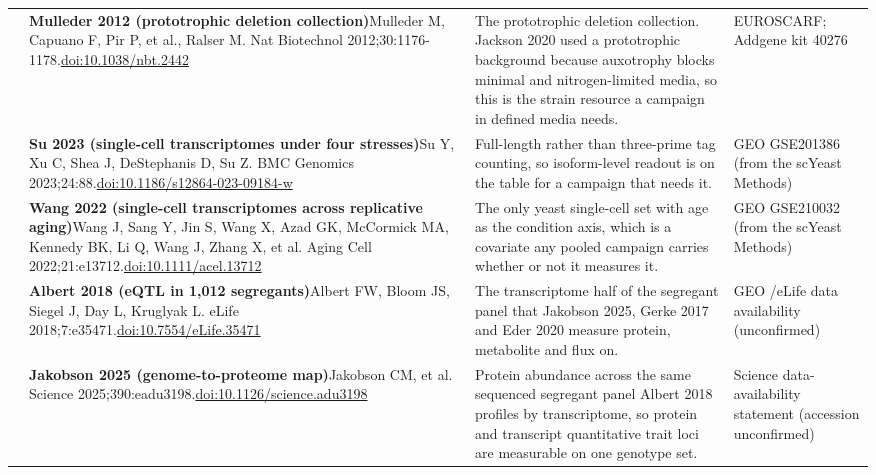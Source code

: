 \begin{landscape}
\begin{longtable}{@{}r@{\hspace{4pt}} L{86mm} L{92mm} L{62mm}@{}}
 & \textbf{Mulleder 2012 (prototrophic deletion collection)}\newline Mulleder M, Capuano F, Pir P, et al., Ralser M. Nat Biotechnol 2012;30:1176-1178.\newline \href{https://doi.org/10.1038/nbt.2442}{doi:10.1038/\allowbreak nbt.2442} & The prototrophic deletion collection. Jackson 2020 used a prototrophic background because auxotrophy blocks minimal and nitrogen-limited media, so this is the strain resource a campaign in defined media needs. & EUROSCARF; Addgene kit 40276 \\
 & \textbf{Su 2023 (single-cell transcriptomes under four stresses)}\newline Su Y, Xu C, Shea J, DeStephanis D, Su Z. BMC Genomics 2023;24:88.\newline \href{https://doi.org/10.1186/s12864-023-09184-w}{doi:10.1186/\allowbreak s12864-023-09184-w} & Full-length rather than three-prime tag counting, so isoform-level readout is on the table for a campaign that needs it. & GEO GSE201386 (from the scYeast Methods) \\
 & \textbf{Wang 2022 (single-cell transcriptomes across replicative aging)}\newline Wang J, Sang Y, Jin S, Wang X, Azad GK, McCormick MA, Kennedy BK, Li Q, Wang J, Zhang X, et al. Aging Cell 2022;21:e13712.\newline \href{https://doi.org/10.1111/acel.13712}{doi:10.1111/\allowbreak acel.13712} & The only yeast single-cell set with age as the condition axis, which is a covariate any pooled campaign carries whether or not it measures it. & GEO GSE210032 (from the scYeast Methods) \\
 & \textbf{Albert 2018 (eQTL in 1,012 segregants)}\newline Albert FW, Bloom JS, Siegel J, Day L, Kruglyak L. eLife 2018;7:e35471.\newline \href{https://doi.org/10.7554/eLife.35471}{doi:10.7554/\allowbreak eLife.35471} & The transcriptome half of the segregant panel that Jakobson 2025, Gerke 2017 and Eder 2020 measure protein, metabolite and flux on. & GEO /\allowbreak  eLife data availability (unconfirmed) \\
 & \textbf{Jakobson 2025 (genome-to-proteome map)}\newline Jakobson CM, et al. Science 2025;390:eadu3198.\newline \href{https://doi.org/10.1126/science.adu3198}{doi:10.1126/\allowbreak science.adu3198} & Protein abundance across the same sequenced segregant panel Albert 2018 profiles by transcriptome, so protein and transcript quantitative trait loci are measurable on one genotype set. & Science data-availability statement (accession unconfirmed) \\

\end{longtable}
\end{landscape}
